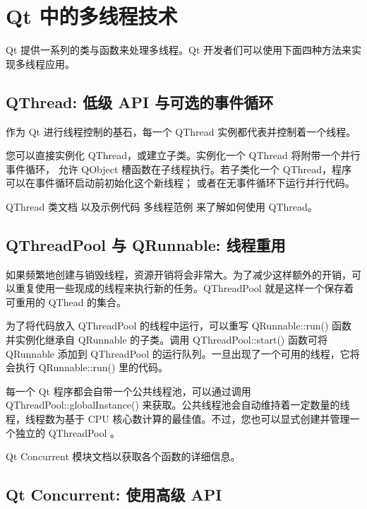 \chapter{Qt 中的多线程技术}

Qt 提供一系列的类与函数来处理多线程。Qt 开发者们可以使用下面四种方法来实现多线程应用。

\section{QThread: 低级 API 与可选的事件循环}

作为 Qt 进行线程控制的基石，每一个 QThread 实例都代表并控制着一个线程。

您可以直接实例化 QThread，或建立子类。实例化一个 QThread 将附带一个并行事件循环，
允许 QObject 槽函数在子线程执行。若子类化一个 QThread，程序可以在事件循环启动前初始化这个新线程；
或者在无事件循环下运行并行代码。

\begin{notice}[另请参阅]
QThread 类文档 以及示例代码 多线程范例 来了解如何使用 QThread。
\end{notice}

\section{QThreadPool 与 QRunnable: 线程重用}

如果频繁地创建与销毁线程，资源开销将会非常大。为了减少这样额外的开销，可以重复使用一些现成的线程来执行新的任务。QThreadPool 就是这样一个保存着可重用的 QThead 的集合。

为了将代码放入 QThreadPool 的线程中运行，可以重写 QRunnable::run() 函数并实例化继承自 QRunnable 的子类。调用 QThreadPool::start() 函数可将 QRunnable 添加到 QThreadPool 的运行队列。一旦出现了一个可用的线程，它将会执行 QRunnable::run() 里的代码。

每一个 Qt 程序都会自带一个公共线程池，可以通过调用 QThreadPool::globalInstance() 来获取。公共线程池会自动维持着一定数量的线程，线程数为基于 CPU 核心数计算的最佳值。不过，您也可以显式创建并管理一个独立的 QThreadPool 。

\begin{notice}[另请参阅]
Qt Concurrent 模块文档以获取各个函数的详细信息。
\end{notice}
    


\section{Qt Concurrent: 使用高级 API}


